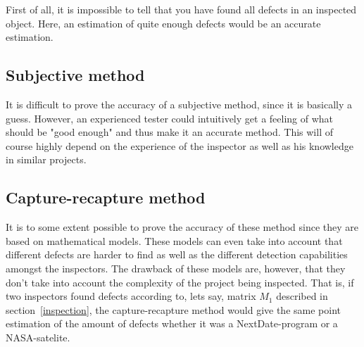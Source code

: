 First of all, it is impossible to tell that you have found all defects in an inspected object. Here, an estimation of quite enough defects would be an accurate estimation. 

\subsection{Subjective method}
It is difficult to prove the accuracy of a subjective method, since it is basically a guess. However, an experienced tester could intuitively get a feeling of what should be "good enough" and thus make it an accurate method. 
This will of course highly depend on the experience of the inspector as well as his knowledge in similar projects.

\subsection{Capture-recapture method}
It is to some extent possible to prove the accuracy of these method since they are based on mathematical models. These models can even take into account that different defects are harder to find as well as the different detection capabilities amongst the inspectors. The drawback of these models are, however, that they don't take into account the complexity of the project being inspected. That is, if two inspectors found defects according to, lets say, matrix $M_{1}$ described in section~\ref{inspection}, the capture-recapture method would give the same point estimation of the amount of defects whether it was a NextDate-program or a NASA-satelite.

